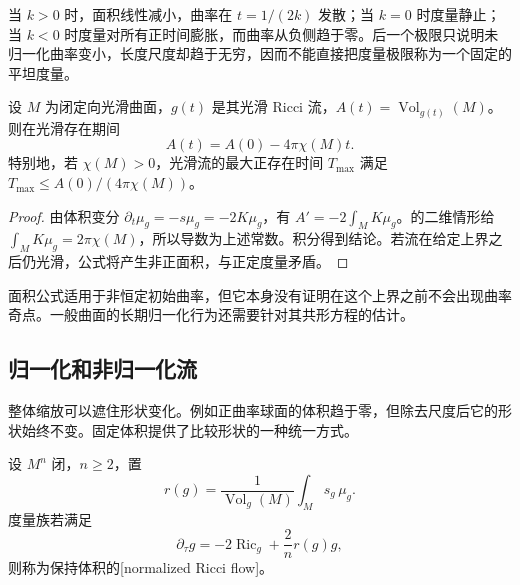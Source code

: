 当 \(k>0\) 时，面积线性减小，曲率在 \(t=1/(2k)\) 发散；当 \(k=0\) 时度量静止；当 \(k<0\) 时度量对所有正时间膨胀，而曲率从负侧趋于零。后一个极限只说明未归一化曲率变小，长度尺度却趋于无穷，因而不能直接把度量极限称为一个固定的平坦度量。

\begin{proposition}\label{g3:prop:ricci-flow-surface-area}
	设 \(M\) 为闭定向光滑曲面，\(g(t)\) 是其光滑 Ricci 流，\(A(t)=\operatorname{Vol}_{g(t)}(M)\)。则在光滑存在期间
	\[
		A(t)=A(0)-4\pi\chi(M)t.
	\]
	特别地，若 \(\chi(M)>0\)，光滑流的最大正存在时间 \(T_{\max}\) 满足 \(T_{\max}\le A(0)/(4\pi\chi(M))\)。
\end{proposition}
\begin{proof}
	由体积变分 \(\partial_t\mu_g=-s\mu_g=-2K\mu_g\)，有 \(A'=-2\int_MK\mu_g\)。的二维情形给 \(\int_MK\mu_g=2\pi\chi(M)\)，所以导数为上述常数。积分得到结论。若流在给定上界之后仍光滑，公式将产生非正面积，与正定度量矛盾。
\end{proof}

面积公式适用于非恒定初始曲率，但它本身没有证明在这个上界之前不会出现曲率奇点。一般曲面的长期归一化行为还需要针对其共形方程的估计。

\subsection{归一化和非归一化流}
\label{g3:subsec:2705:02}
整体缩放可以遮住形状变化。例如正曲率球面的体积趋于零，但除去尺度后它的形状始终不变。固定体积提供了比较形状的一种统一方式。

\begin{definition}\label{g3:def:normalized-ricci-flow}
	设 \(M^n\) 闭，\(n\ge2\)，置
	\[
		r(g)=\frac{1}{\operatorname{Vol}_g(M)}\int_Ms_g\,\mu_g.
	\]
	度量族若满足
	\begin{equation}\label{g3:eq:normalized-ricci-flow}
		\partial_\tau g=-2\operatorname{Ric}_g+\frac2n r(g)g,
	\end{equation}
	则称为保持体积的[normalized Ricci flow]。
\end{definition}

